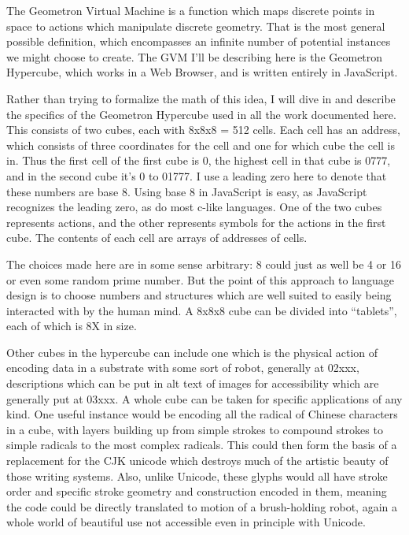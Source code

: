 \documentclass[11pt]{article}
\begin{document}
    The Geometron Virtual Machine is a function which maps discrete points in space to actions which manipulate discrete geometry.  That is the most general possible definition, which encompasses an infinite number of potential instances we might choose to create.  The GVM I'll be describing here is the Geometron Hypercube, which works in a Web Browser, and is written entirely in JavaScript.   


    Rather than trying to formalize the math of this idea, I will dive in and describe the specifics of the Geometron Hypercube used in all the work documented here.  This consists of two cubes, each with 8x8x8 = 512 cells.  Each cell has an address, which consists of three coordinates for the cell and one for which cube the cell is in.  Thus the first cell of the first cube is 0, the highest cell in that cube is 0777, and in the second cube it's 0 to 01777.  I use a leading zero here to denote that these numbers are base 8.  Using base 8 in JavaScript is easy, as JavaScript recognizes the leading zero, as do most c-like languages.   One of the two cubes represents actions, and the other represents symbols for the actions in the first cube.  The contents of each cell are arrays of addresses of cells.  

    The choices made here are in some sense arbitrary: 8 could just as well be 4 or 16 or even some random prime number.  But the point of this approach to language design is to choose numbers and structures which are well suited to easily being interacted with by the human mind.  A 8x8x8 cube can be divided into ``tablets'', each of which is 8X in size.  

    Other cubes in the hypercube can include one which is the physical action of encoding data in a substrate with some sort of robot, generally at 02xxx, descriptions which can be put in alt text of images for accessibility which are generally put at 03xxx.  A whole cube can be taken for specific applications of any kind.  One useful instance would be encoding all the radical of Chinese characters in a cube, with layers building up from simple strokes to compound strokes to simple radicals to the most complex radicals.  This could then form the basis of a replacement for the CJK unicode which destroys much of the artistic beauty of those writing systems.  Also, unlike Unicode, these glyphs would all have stroke order and specific stroke geometry and construction encoded in them, meaning the code could be directly translated to motion of a brush-holding robot, again a whole world of beautiful use not accessible even in principle with Unicode.
\end{document}
